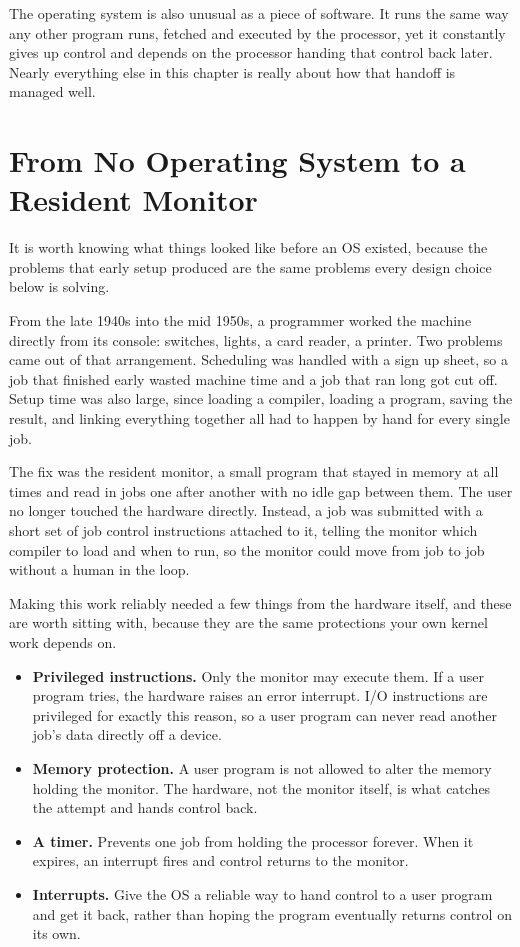 \documentclass[11pt]{article}
\begin{document}
The operating system is also unusual as a piece of software. It runs the same way any other program runs, fetched and executed by the processor, yet it constantly gives up control and depends on the processor handing that control back later. Nearly everything else in this chapter is really about how that handoff is managed well.

\section{From No Operating System to a Resident Monitor}

It is worth knowing what things looked like before an OS existed, because the problems that early setup produced are the same problems every design choice below is solving.

From the late 1940s into the mid 1950s, a programmer worked the machine directly from its console: switches, lights, a card reader, a printer. Two problems came out of that arrangement. Scheduling was handled with a sign up sheet, so a job that finished early wasted machine time and a job that ran long got cut off. Setup time was also large, since loading a compiler, loading a program, saving the result, and linking everything together all had to happen by hand for every single job.

The fix was the resident monitor, a small program that stayed in memory at all times and read in jobs one after another with no idle gap between them. The user no longer touched the hardware directly. Instead, a job was submitted with a short set of job control instructions attached to it, telling the monitor which compiler to load and when to run, so the monitor could move from job to job without a human in the loop.

Making this work reliably needed a few things from the hardware itself, and these are worth sitting with, because they are the same protections your own kernel work depends on.

\begin{itemize}[leftmargin=1.4em]
  \item \textbf{Privileged instructions.} Only the monitor may execute them. If a user program tries, the hardware raises an error interrupt. I/O instructions are privileged for exactly this reason, so a user program can never read another job's data directly off a device.
  \item \textbf{Memory protection.} A user program is not allowed to alter the memory holding the monitor. The hardware, not the monitor itself, is what catches the attempt and hands control back.
  \item \textbf{A timer.} Prevents one job from holding the processor forever. When it expires, an interrupt fires and control returns to the monitor.
  \item \textbf{Interrupts.} Give the OS a reliable way to hand control to a user program and get it back, rather than hoping the program eventually returns control on its own.
\end{itemize}
\end{document}

